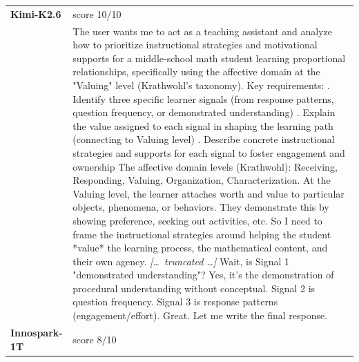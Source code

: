\begin{longtable}{@{}l p{12.5cm}@{}}
  \midrule
  \textbf{Kimi-K2.6} & score 10/10 \\
  & The user wants me to act as a teaching assistant and analyze how to prioritize instructional strategies and motivational supports for a middle-school math student learning proportional relationships, specifically using the affective domain at the "Valuing" level (Krathwohl's taxonomy). \newline Key requirements: \newline 1. Identify three specific learner signals (from response patterns, question frequency, or demonstrated understanding) \newline 2. Explain the value assigned to each signal in shaping the learning path (connecting to Valuing level) \newline 3. Describe concrete instructional strategies and supports for each signal to foster engagement and ownership \newline The affective domain levels (Krathwohl): Receiving, Responding, Valuing, Organization, Characterization. At the Valuing level, the learner attaches worth and value to particular objects, phenomena, or behaviors. They demonstrate this by showing preference, seeking out activities, etc. So I need to frame the instructional strategies around helping the student *value* the learning process, the mathematical content, and their own agency. \newline \textit{[\ldots\ truncated \ldots]} \newline Wait, is Signal 1 "demonstrated understanding"? Yes, it's the demonstration of procedural understanding without conceptual. Signal 2 is question frequency. Signal 3 is response patterns (engagement/effort). Great. \newline Let me write the final response. \\
  \textbf{Innospark-1T} & score 8/10 \\

\end{longtable}
